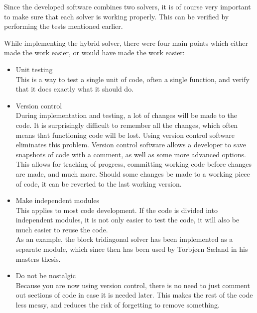 Since the developed software combines two solvers, it is of course very important to make sure that each solver is working properly. 
This can be verified by performing the tests mentioned earlier. 

While implementing the hybrid solver, there were four main points which either made the work easier, or would have made the work easier:

\begin{itemize}
 \item Unit testing\\
 This is a way to test a single unit of code, often a single function, and verify that it does exactly what it should do. \\
 \item Version control\\
 During implementation and testing, a lot of changes will be made to the code. It is surprisingly difficult to remember all the changes, which often means that functioning code will be lost. 
 Using version control software eliminates this problem. Version control software allows a developer to save snapshots of code with a comment, as well as some more advanced options. This allows for tracking of progress, committing working code before changes are made, and much more. Should some changes be made to a working piece of code, it can be reverted to the last working version.\\
 \item Make independent modules\\
 This applies to most code development. If the code is divided into independent modules, it is not only easier to test the code, it will also be much easier to reuse the code. \\
 As an example, the block tridiagonal solver has been implemented as a separate module, which since then has been used by Torbjørn Sæland in his masters thesis.\\
 \item Do not be nostalgic\\
 Because you are now using version control, there is no need to just comment out sections of code in case it is needed later. 
 This makes the rest of the code less messy, and reduces the risk of forgetting to remove something.
\end{itemize}

